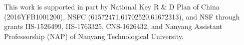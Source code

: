 \documentclass[sigconf]{acmart}
\begin{document}
\begin{acks}
	This work is supported in part by National Key R \& D Plan of China (2016YFB1001200), NSFC
	(61572471,61702520,61672313), and NSF through grants IIS-1526499, IIS-1763325, CNS-1626432, and Nanyang Assistant Professorship (NAP) of Nanyang Technological University.
	
\end{acks}




\end{document}
